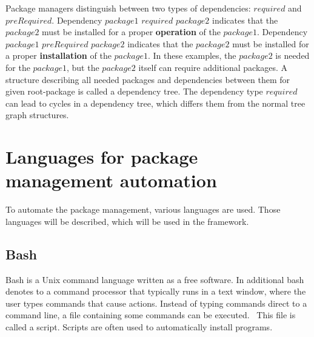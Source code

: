 Package managers distinguish between two types of dependencies: $required$ and $preRequired$. %
Dependency $package1$ \textbf{$required$} $package2$ indicates that the $package2$ must be installed for a proper \textbf{operation} of the $package1$. %
Dependency $package1$ \textbf{$preRequired$} $package2$ indicates that the $package2$ must be installed for a proper \textbf{installation} of the $package1$. %
In these examples, the $package2$ is needed for the $package1$, but the $package2$ itself can require additional packages.
A structure describing all needed packages and dependencies between them for given root-package is called a dependency tree. 
The dependency type $required$ can lead to cycles in a dependency tree, which differs them from the normal tree graph structures.

\section{Languages for package management automation}
To automate the package management, various languages are used. 
Those languages will be described, which will be used in the framework.
\subsection*{Bash} \label{lang:bash}
Bash is a Unix command language written as a free software.
In additional bash denotes to a command processor that typically runs in a text window, where the user types commands that cause actions.
Instead of typing commands direct to a command line, a file containing some commands can be executed.~\cite{bash}
This file is called a script.
Scripts are often used to automatically install programs.
